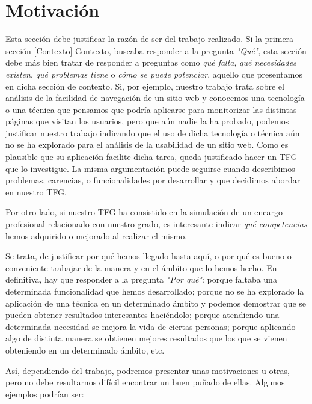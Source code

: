 \section{Motivación}\label{Motivation}
Esta sección debe justificar la razón de ser del trabajo realizado. Si la primera sección \ref{Contexto} Contexto, buscaba responder a la pregunta \textit{"Qué"}, esta sección debe más bien tratar de responder a preguntas como \textit{qué falta}, \textit{qué necesidades existen}, \textit{qué problemas tiene} o \textit{cómo se puede potenciar}, aquello que presentamos en dicha sección de contexto. Si, por ejemplo, nuestro trabajo trata sobre el análisis de la facilidad de navegación de un sitio web y conocemos una tecnología o una técnica que pensamos que podría aplicarse para monitorizar las distintas páginas que visitan los usuarios, pero que aún nadie la ha probado, podemos justificar nuestro trabajo indicando que el uso de dicha tecnología o técnica aún no se ha explorado para el análisis de la usabilidad de un sitio web. Como es plausible que su aplicación facilite dicha tarea, queda justificado hacer un TFG que lo investigue. La misma argumentación puede seguirse cuando describimos problemas, carencias, o funcionalidades por desarrollar y que decidimos abordar en nuestro TFG.

Por otro lado, si nuestro TFG ha consistido en la simulación de un encargo profesional relacionado con nuestro grado, es interesante indicar \textit{qué competencias} hemos adquirido o mejorado al realizar el mismo.

Se trata, de justificar por qué hemos llegado hasta aquí, o por qué es bueno o conveniente trabajar de la manera y en el ámbito que lo hemos hecho. En definitiva, hay que responder a la pregunta \textit{"Por qué"}: porque faltaba una determinada funcionalidad que hemos desarrollado; porque no se ha explorado la aplicación de una técnica en un determinado ámbito y podemos demostrar que se pueden obtener resultados interesantes haciéndolo; porque atendiendo una determinada necesidad se mejora la vida de ciertas personas; porque aplicando algo de distinta manera se obtienen mejores resultados que los que se vienen obteniendo en un determinado ámbito, etc.

Así, dependiendo del trabajo, podremos presentar unas motivaciones u otras, pero no debe resultarnos difícil encontrar un buen puñado de ellas. Algunos ejemplos podrían ser: 

